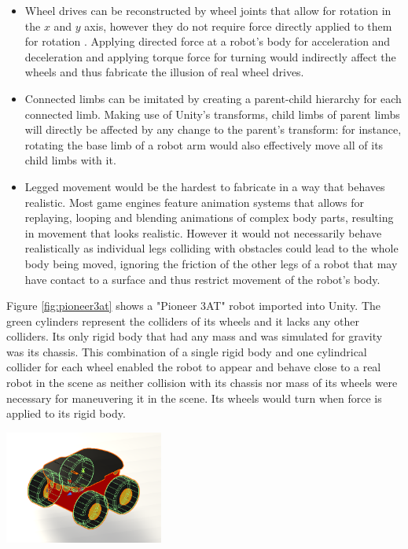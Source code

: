\begin{itemize}
    \item Wheel drives can be reconstructed by wheel joints that allow for rotation in the $x$ and $y$ axis, however they do not require force directly applied to them for rotation . Applying directed force at a robot's body for acceleration and deceleration and applying torque force for turning would indirectly affect the wheels and thus fabricate the illusion of real wheel drives. 
    \item Connected limbs can be imitated by creating a parent-child hierarchy for each connected limb. Making use of Unity's transforms, child limbs of parent limbs will directly be affected by any change to the parent's transform: for instance, rotating the base limb of a robot arm would also effectively move all of its child limbs with it.
    \item Legged movement would be the hardest to fabricate in a way that behaves realistic. Most game engines feature animation systems that allows for replaying, looping and blending animations of complex body parts, resulting in movement that looks realistic. However it would not necessarily behave realistically as individual legs colliding with obstacles could lead to the whole body being moved, ignoring the friction of the other legs of a robot that may have contact to a surface and thus restrict movement of the robot's body.
\end{itemize}

Figure \ref{fig:pioneer3at} shows a "Pioneer 3AT" robot imported into Unity. The green cylinders represent the colliders of its wheels and it lacks any other colliders. Its only rigid body that had any mass and was simulated for gravity was its chassis. This combination of a single rigid body and one cylindrical collider for each wheel enabled the robot to appear and behave close to a real robot in the scene as neither collision with its chassis nor mass of its wheels were necessary for maneuvering it in the scene. Its wheels would turn when force is applied to its rigid body.

\begin{center}
    \includegraphics[width=0.39\textwidth]{tex/img/ch05/Pioneer3AT.png}
    \label{fig:pioneer3at}
\end{center}

